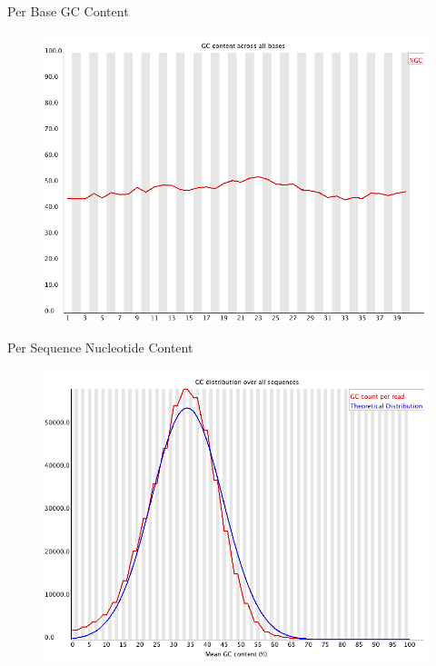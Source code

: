 \begin{frame}{Per Base GC Content}

\begin{figure}[htbp]
\centering
\includegraphics[width=\textwidth,height=0.8\textheight,keepaspectratio]{images/per_base_gc_content}
\end{figure}

\end{frame}

\begin{frame}{Per Sequence Nucleotide Content}

\begin{figure}[htbp]
\centering
\includegraphics[width=\textwidth,height=0.8\textheight,keepaspectratio]{images/per_sequence_gc_content}
\end{figure}

\end{frame}

